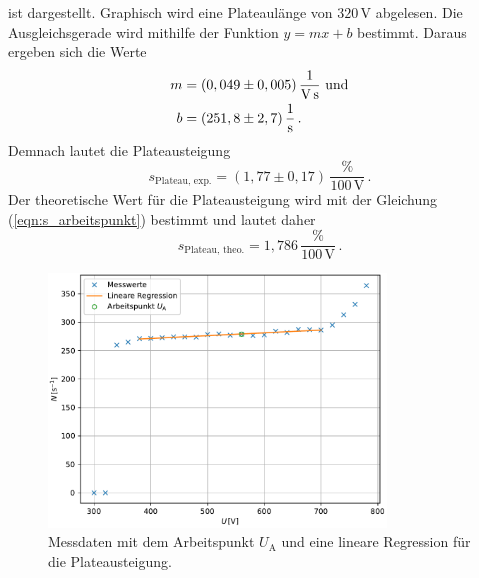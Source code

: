 ist dargestellt. Graphisch wird eine Plateaulänge von $320\,\unit{\volt}$ abgelesen. Die Ausgleichsgerade wird mithilfe der Funktion $y = mx+b$ bestimmt. Daraus ergeben sich die Werte
\begin{align*}
  m &= (0,049\pm0,005)\,\unit[per-mode=fraction]{\per\volt\per\second}\,\,\text{und}\\
  b &= (251,8\pm2,7)\,\unit[per-mode=fraction]{\per\second}\,.
\end{align*}
Demnach lautet die Plateausteigung 
$$s_{\text{Plateau, exp.}} = (1,77\pm0,17)\,\frac{\%}{100\,\unit{\volt}}\,.$$
Der theoretische Wert für die Plateausteigung wird mit der Gleichung (\ref{eqn:s_arbeitspunkt}) bestimmt und lautet daher 
$$s_{\text{Plateau, theo.}} =  1,786 \,\frac{\%}{100\,\unit{\volt}}\,.$$

\begin{figure}[H]
  \centering
  \includegraphics[width=0.8\textwidth]{Kennlinie.pdf}
  \caption{Messdaten mit dem Arbeitspunkt $U_{\text{A}}$ und eine lineare Regression für die Plateausteigung.}
  \label{fig:Kennlinie_Plot}
\end{figure}

